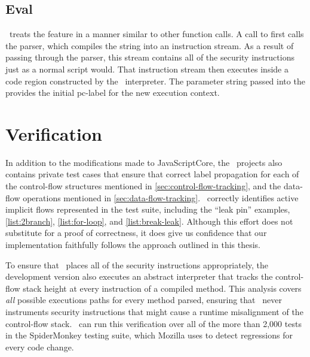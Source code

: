 \subsection{Eval}
\label{sec:eval}
\FlowCore\ treats the  feature in a manner similar to other function calls.
A call to  first calls the parser, which compiles the string into an instruction stream.
As a result of passing through the parser, this stream contains all of the security instructions just as a normal script would.
That instruction stream then executes inside a code region constructed by the \FlowCore\ interpreter.
The parameter string passed into the  provides the initial pc-label for the new execution context.

\section{Verification}

In addition to the modifications made to JavaScriptCore, the \FlowCore\ projects also contains private test cases that ensure that correct label propagation for each of the control-flow structures mentioned in \autoref{sec:control-flow-tracking}, and the data-flow operations mentioned in \autoref{sec:data-flow-tracking}.
\FlowCore\ correctly identifies active implicit flows represented in the test suite, including the ``leak pin'' examples, \autoref{list:2branch}, \autoref{list:for-loop}, and \autoref{list:break-leak}.
Although this effort does not substitute for a proof of correctness, it does give us confidence that our implementation faithfully follows the approach outlined in this thesis.

To ensure that \FlowCore\ places all of the security instructions appropriately, the development version also executes an abstract interpreter that tracks the control-flow stack height at every instruction of a compiled method.
This analysis covers \emph{all} possible executions paths for every method parsed, ensuring that \FlowCore\ never instruments security instructions that might cause a runtime misalignment of the control-flow stack.
\FlowCore\ can run this verification over all of the more than 2,000 tests in the SpiderMonkey testing suite, which Mozilla uses to detect regressions for every code change.






